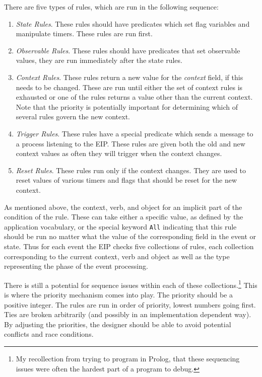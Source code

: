 \documentclass{article}
\begin{document}
  There are five types of rules, which are run in the following
  sequence:
  \begin{enumerate}
  \item \textit{State Rules}.  These rules should have predicates
    which set flag variables and manipulate timers.  These rules are
    run first.
  \item \textit{Observable Rules}.  These rules should have predicates
    that set observable values, they are run immediately after the
    state rules.
  \item \textit{Context Rules}.  These rules return a new value for
    the \textit{context} field, if this needs to be changed.  These
    are run until either the set of context rules is exhausted or one
    of the rules returns a value other than the current context.  Note
    that the priority is potentially important for determining which
    of several rules govern the new context.
  \item \textit{Trigger Rules}.  These rules have a special predicate
    which sends a message to a process listening to the EIP.  These
    rules are given both the old and new context values as often they
    will trigger when the context changes.
  \item \textit{Reset Rules}.  These rules run only if the context
    changes.  They are used to reset values of various timers and
    flags that should be reset for the new context.
  \end{enumerate}

  As mentioned above, the context, verb, and object for an implicit
  part of the condition of the rule.  These can take either a specific
  value, as defined by the application vocabulary, or the special
  keyword \texttt{All} indicating that this rule should be run no
  matter what the value of the corresponding field in the event or
  state.  Thus for each event the EIP checks five collections of
  rules, each collection corresponding to the current context, verb
  and object as well as the type representing the phase of the event
  processing.

  There is still a potential for sequence issues within each of these
  collections.\footnote{My recollection from trying to program in
    Prolog, that these sequencing issues were often the hardest part
    of a program to debug.}  This is where the priority mechanism
  comes into play. The priority should be a positive integer.  The
  rules are run in order of priority, lowest numbers going first.
  Ties are broken arbitrarily (and possibly in an implementation
  dependent way).  By adjusting the priorities, the designer should be
  able to avoid potential conflicts and race conditions.
\end{document}
